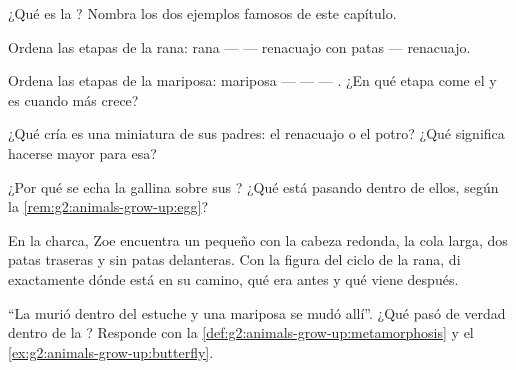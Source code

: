 \begin{exercise}[$\star$]\label{exo:g2:animals-grow-up:4}
¿Qué es la ? Nombra los dos ejemplos famosos de este
capítulo.
\end{exercise}

\begin{exercise}[$\star$]\label{exo:g2:animals-grow-up:5}
Ordena las etapas de la rana: rana ---  --- renacuajo con patas
--- renacuajo.
\end{exercise}

\begin{exercise}[$\star$]\label{exo:g2:animals-grow-up:6}
Ordena las etapas de la mariposa: mariposa ---  ---  ---
. ¿En qué etapa come  el  y es cuando más crece?
\end{exercise}

\begin{exercise}[$\star$]\label{exo:g2:animals-grow-up:7}
¿Qué cría es una miniatura de sus padres: el renacuajo o el potro?
¿Qué significa hacerse mayor para esa?
\end{exercise}

\begin{exercise}[$\star$]\label{exo:g2:animals-grow-up:8}
¿Por qué se echa la gallina sobre sus ? ¿Qué está pasando dentro
de ellos, según la \cref{rem:g2:animals-grow-up:egg}?
\end{exercise}

\begin{exercise}[$\star\star$]\label{exo:g2:animals-grow-up:9}
En la charca, Zoe encuentra un  pequeño con la cabeza redonda,
la cola larga, dos patas traseras y sin patas delanteras. Con la
figura del ciclo de la rana, di exactamente dónde está en su camino,
qué era antes y qué viene después.
\end{exercise}

\begin{exercise}[$\star\star$]\label{exo:g2:animals-grow-up:10}
``La  murió dentro del estuche y una mariposa se mudó allí''.
¿Qué pasó de verdad dentro de la ? Responde con la
\cref{def:g2:animals-grow-up:metamorphosis} y el
\cref{ex:g2:animals-grow-up:butterfly}.
\end{exercise}
